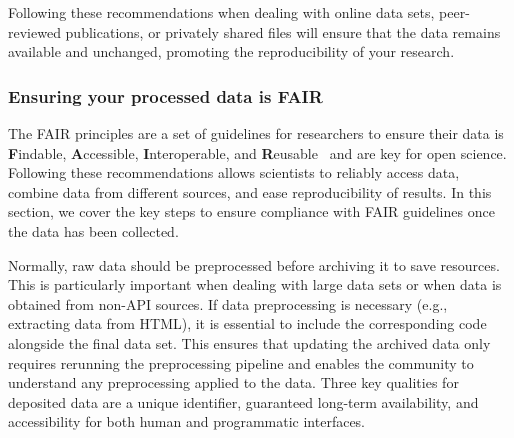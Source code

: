 \documentclass[9pt,lessons]{livecoms}
\begin{document}
Following these recommendations when dealing with online data sets, peer-reviewed publications, or privately shared files will ensure that the data remains available and unchanged, promoting the reproducibility of your research.




\subsubsection{Ensuring your processed data is FAIR}

The FAIR principles are a set of guidelines for researchers to ensure their data is \textbf{F}indable, \textbf{A}ccessible, \textbf{I}nteroperable, and \textbf{R}eusable~\cite{wilkinson2016fair} and are key for open science. 
Following these recommendations allows scientists to reliably access data, combine data from different sources, and ease reproducibility of results.  
In this section, we cover the key steps to ensure compliance with FAIR guidelines once the data has been collected.


Normally, raw data should be preprocessed before archiving it to save resources. This is particularly important when dealing with large data sets or when data is obtained from non-API sources.
If data preprocessing is necessary (e.g., extracting data from HTML), it is essential to include the corresponding code alongside the final data set. 
This ensures that updating the archived data only requires rerunning the preprocessing pipeline and enables the community to understand any preprocessing applied to the data. 
Three key qualities for deposited data are a unique identifier, guaranteed long-term availability, and accessibility for both human and programmatic interfaces.
\end{document}
